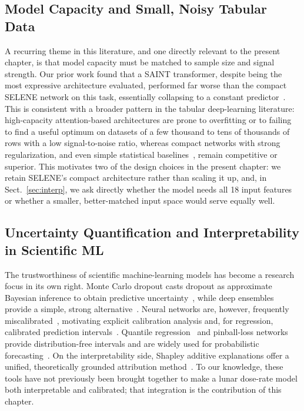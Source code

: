 \documentclass[graybox]{SNmult}
\begin{document}
\subsection{Model Capacity and Small, Noisy Tabular Data}
A recurring theme in this literature, and one directly relevant to the present
chapter, is that model capacity must be matched to sample size and signal
strength. Our prior work found that a SAINT transformer, despite being the most
expressive architecture evaluated, performed far worse than the compact SELENE
network on this task, essentially collapsing to a constant
predictor~\cite{tummala2025selene}. This is consistent with a broader pattern in
the tabular deep-learning literature: high-capacity attention-based architectures
are prone to overfitting or to failing to find a useful optimum on datasets of a
few thousand to tens of thousands of rows with a low signal-to-noise ratio,
whereas compact networks with strong regularization, and even simple statistical
baselines~\cite{breiman2001random,bishop2006pattern}, remain competitive or
superior. This motivates two of the design choices in the present chapter: we
retain SELENE's compact architecture rather than scaling it up, and, in
Sect.~\ref{sec:interp}, we ask directly whether the model needs all 18 input
features or whether a smaller, better-matched input space would serve equally
well.

\subsection{Uncertainty Quantification and Interpretability in Scientific ML}
The trustworthiness of scientific machine-learning models has become a research
focus in its own right. Monte Carlo dropout casts dropout as approximate
Bayesian inference to obtain predictive uncertainty~\cite{gal2016dropout}, while
deep ensembles provide a simple, strong alternative~\cite{lakshminarayanan2017ensembles}.
Neural networks are, however, frequently miscalibrated~\cite{guo2017calibration},
motivating explicit calibration analysis and, for regression, calibrated
prediction intervals~\cite{kuleshov2018calibrated}. Quantile
regression~\cite{koenker1978regression} and pinball-loss networks provide
distribution-free intervals and are widely used for probabilistic
forecasting~\cite{rasp2018neural}. On the interpretability side, Shapley additive
explanations offer a unified, theoretically grounded attribution
method~\cite{lundberg2017shap}. To our knowledge, these tools have not previously
been brought together to make a lunar dose-rate model both interpretable and
calibrated; that integration is the contribution of this chapter.
\end{document}

